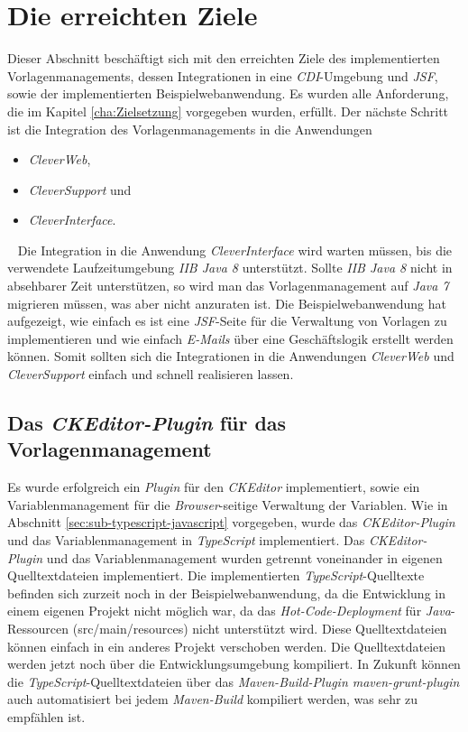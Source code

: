 \section{Die erreichten Ziele}
Dieser Abschnitt beschäftigt sich mit den erreichten Ziele des implementierten Vorlagenmanagements, dessen Integrationen in eine \emph{CDI}-Umgebung und \emph{JSF}, sowie der implementierten Beispielwebanwendung. Es wurden alle Anforderung, die im Kapitel \ref{cha:Zielsetzung} vorgegeben wurden, erfüllt. Der nächste Schritt ist die Integration des Vorlagenmanagements in die Anwendungen
\begin{itemize}
	\item\emph{CleverWeb},
	\item\emph{CleverSupport} und
	\item\emph{CleverInterface}.
\end{itemize}
\ \newline
Die Integration in die Anwendung \emph{CleverInterface} wird warten müssen, bis die verwendete Laufzeitumgebung \emph{IIB Java 8} unterstützt. Sollte \emph{IIB Java 8} nicht in absehbarer Zeit unterstützen, so wird man das Vorlagenmanagement auf \emph{Java 7} migrieren müssen, was aber nicht anzuraten ist. Die Beispielwebanwendung hat aufgezeigt, wie einfach es ist eine \emph{JSF}-Seite für die Verwaltung von Vorlagen zu implementieren und wie einfach \emph{E-Mails} über eine Geschäftslogik erstellt werden können. Somit sollten sich die Integrationen in die Anwendungen \emph{CleverWeb} und \emph{CleverSupport} einfach und schnell realisieren lassen. 

\subsection{Das \emph{CKEditor-Plugin} für das Vorlagenmanagement}
Es wurde erfolgreich ein \emph{Plugin} für den \emph{CKEditor} implementiert, sowie ein Variablenmanagement für die \emph{Browser}-seitige Verwaltung der Variablen. Wie in Abschnitt \ref{sec:sub-typescript-javascript} vorgegeben, wurde das \emph{CKEditor-Plugin} und das Variablenmanagement in \emph{TypeScript} implementiert. Das \emph{CKEditor-Plugin} und das Variablenmanagement wurden getrennt voneinander in eigenen Quelltextdateien implementiert. Die implementierten \emph{TypeScript}-Quelltexte befinden sich zurzeit noch in der Beispielwebanwendung, da die Entwicklung in einem eigenen Projekt nicht möglich war, da das \emph{Hot-Code-Deployment} für \emph{Java}-Ressourcen (src/main/resources) nicht unterstützt wird. Diese Quelltextdateien können einfach in ein anderes Projekt verschoben werden. Die Quelltextdateien werden jetzt noch über die Entwicklungsumgebung kompiliert. In Zukunft können die \emph{TypeScript}-Quelltextdateien über das \emph{Maven-Build-Plugin maven-grunt-plugin} auch automatisiert bei jedem \emph{Maven-Build} kompiliert werden, was sehr zu empfählen ist.

